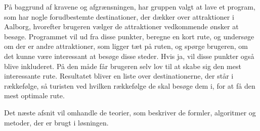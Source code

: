 På baggrund af kravene og afgrænsningen, har gruppen valgt at lave et program, som har nogle forudbestemte destinationer, der dækker over attraktioner i Aalborg, hvorefter brugeren vælger de attraktioner vedkommende ønsker at besøge. Programmet vil ud fra disse punkter, beregne en kort rute, og undersøge om der er andre attraktioner, som ligger tæt på ruten, og spørge brugeren, om det kunne være interessant at besøge disse steder. Hvis ja, vil disse punkter også blive inkluderet. På den måde får brugeren selv lov til at skabe sig den mest interessante rute. Resultatet bliver en liste over destinationerne, der står i rækkefølge, så turisten ved hvilken rækkefølge de skal besøge dem i, for at få den mest optimale rute.

Det næste afsnit vil omhandle de teorier, som beskriver de formler, algoritmer og metoder, der er brugt i løsningen.
